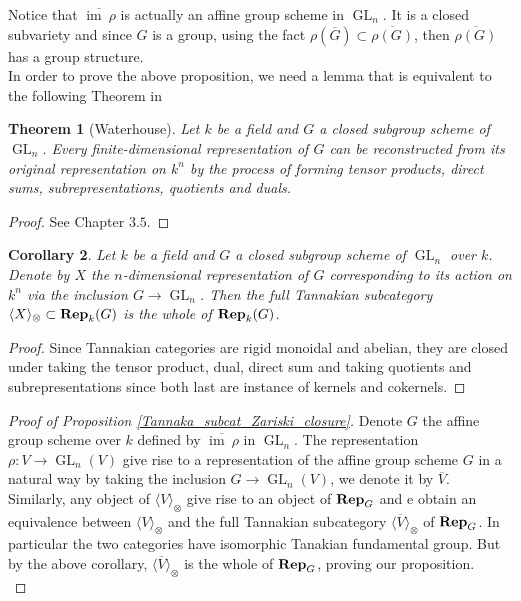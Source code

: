 \documentclass{article}
\theoremstyle{plain}
\newtheorem{theorem}{Theorem}[subsection]
\newtheorem{corollary}[theorem]{Corollary}
\theoremstyle{definition}
\DeclareMathOperator{\GL}{GL}
\DeclareMathOperator{\im}{im}
\DeclareMathOperator{\Rep}{\bf{Rep}}
\begin{document}
\noindent Notice that $\overline{\im\:\rho}$ is actually an affine group scheme in $\GL_n$.
It is a closed subvariety and since $G$ is a group, using the fact $\rho(\overline{G})\subset \overline{\rho(G)}$, then $\overline{\rho(G)}$ has a group structure.\\
In order to prove the above proposition, we need a lemma that is equivalent to the following Theorem in \cite{waterhouse}
\begin{theorem}[Waterhouse]
    Let $k$ be a field and $G$ a closed subgroup scheme of $\GL_n$. Every finite-dimensional representation of $G$ can be reconstructed from its original representation on $k^n$ by the process of forming tensor products, direct sums, subrepresentations, quotients and duals.
\end{theorem}
\begin{proof}
    See \cite{waterhouse} Chapter $3.5$.
\end{proof}

\begin{corollary}
    Let $k$ be a field and $G$ a closed subgroup scheme of $\GL_n$ over $k$.
    Denote by $X$ the $n$-dimensional representation of $G$ corresponding to its action on $k^n$ via the inclusion $G\rightarrow \GL_n$.
    Then the full Tannakian subcategory $\langle X\rangle_{\otimes} \subset \Rep_k(G)$ is the whole of $\Rep_k(G)$.
\end{corollary}
\begin{proof}
    Since Tannakian categories are rigid monoidal and abelian,
    they are closed under taking the tensor product, dual, direct sum and taking quotients and subrepresentations since both last are instance of kernels and cokernels.
\end{proof}


\begin{proof}[Proof of Proposition \ref{Tannaka_subcat_Zariski_closure}]
    Denote $G$ the affine group scheme over $k$ defined by $\overline{\im\:\rho}$ in $\GL_n$.
    The representation $\rho:V\rightarrow \GL_n(V)$ give rise to a representation of the affine group scheme $G$ in a natural way by taking the inclusion $G\rightarrow \GL_n(V)$, we denote it by $\overline{V}$.
    Similarly, any object of $\langle V\rangle_{\otimes}$ give rise to an object of $\Rep_G$ and e obtain an equivalence between $\langle V\rangle_{\otimes}$ and the full Tannakian subcategory $\langle \overline{V}\rangle_{\otimes}$ of $\Rep_G$.
    In particular the two categories have isomorphic Tanakian fundamental group.
    But by the above corollary, $\langle\overline{V}\rangle_{\otimes}$ is the whole of $\Rep_G$, proving our proposition.\\
\end{proof}
\end{document}
